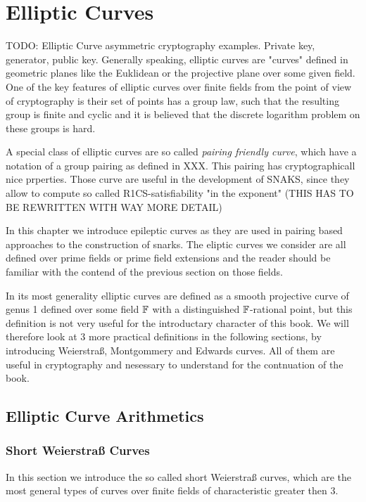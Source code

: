 \chapter{Elliptic Curves}
TODO: Elliptic Curve asymmetric cryptography examples. Private key, generator, public key.
Generally speaking, elliptic curves are "curves" defined in geometric planes like the Euklidean or the projective plane over some given field. One of the key features of elliptic curves over finite fields from the point of view of cryptography is their set of points has a group law, such that the resulting group is finite and cyclic and it is believed that the discrete logarithm problem on these groups is hard.

A special class of elliptic curves are so called \textit{pairing friendly curve}, which have a notation of a group pairing as defined in XXX. This pairing has cryptographicall nice prperties. Those curve are useful in the development of SNAKS, since they allow to compute so called R1CS-satisfiability "in the exponent" (THIS HAS TO BE REWRITTEN WITH WAY MORE DETAIL)

In this chapter we introduce epileptic curves as they are used in pairing based approaches to the construction of snarks. The eliptic curves we consider are all defined over prime fields or prime field extensions and the reader should be familiar with the contend of the previous section on those fields.

In its most generality elliptic curves are defined as a smooth projective curve of genus 1 defined over some field $\mathbb{F}$ with a distinguished $\mathbb{F}$-rational point, but this definition is not very useful for the introductary character of this book. We will therefore look at $3$ more practical definitions in the following sections, by introducing Weierstraß, Montgommery and Edwards curves. All of them are useful in cryptography and nesessary to understand for the contnuation of the book.

\section{Elliptic Curve Arithmetics}

\subsection{Short Weierstraß Curves}
In this section we introduce the so called short Weierstraß curves, which are the most general types of curves over finite fields of characteristic greater then $3$.

